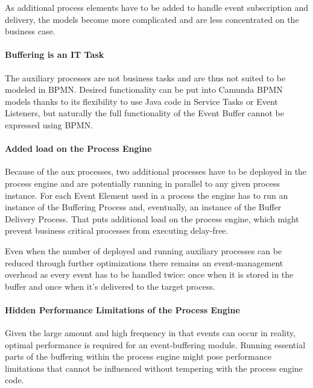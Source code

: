 As additional process elements have to be added to handle event subscription and delivery, the models become more complicated and are less concentrated on the business case.

\paragraph{Buffering is an IT Task\newline}

The auxiliary processes are not business tasks and are thus not suited to be modeled in BPMN.
Desired functionality can be put into Camunda BPMN models thanks to its flexibility to use Java code in Service Tasks or Event Listeners, but naturally the full functionality of the Event Buffer cannot be expressed using BPMN.

\paragraph{Added load on the Process Engine\newline}

Because of the aux processes, two additional processes have to be deployed in the process engine and are potentially running in parallel to any given process instance. For each Event Element used in a process the engine has to run an instance of the Buffering Process and, eventually, an instance of the Buffer Delivery Process.
That puts additional load on the process engine, which might prevent business critical processes from executing delay-free.

Even when the number of deployed and running auxiliary processes can be reduced through further optimizations there remains an event-management overhead as every event has to be handled twice: once when it is stored in the buffer and once when it's delivered to the target process.

\paragraph{Hidden Performance Limitations of the Process Engine\newline}

Given the large amount and high frequency in that events can occur in reality, optimal performance is required for an event-buffering module.
Running essential parts of the buffering within the process engine might pose performance limitations that cannot be influenced without tempering with the process engine code.


